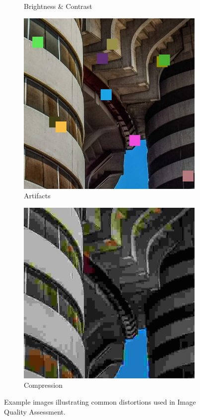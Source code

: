\begin{figure}[ht]
\begin{subfigure}[b]{0.24\textwidth}
        \caption{Brightness \& Contrast}
        \label{fig:brightness_contrast}
    \end{subfigure}
    \hfill
    \begin{subfigure}[b]{0.24\textwidth}
        \includegraphics[width=\textwidth]{img/Artifacts.jpg}
        \caption{Artifacts}
        \label{fig:artifacts}
    \end{subfigure}
    \hfill
    \begin{subfigure}[b]{0.24\textwidth}
        \includegraphics[width=\textwidth]{img/Compression.jpg}
        \caption{Compression}
        \label{fig:compression}
    \end{subfigure}
    \caption{Example images illustrating common distortions used in Image Quality Assessment.}
    \label{fig:distortions}
\end{figure}
